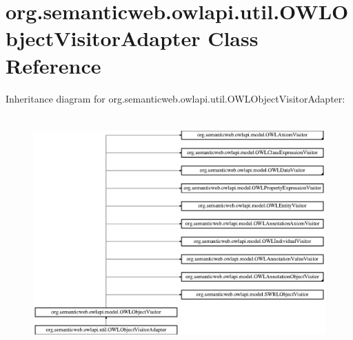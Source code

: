 \hypertarget{classorg_1_1semanticweb_1_1owlapi_1_1util_1_1_o_w_l_object_visitor_adapter}{\section{org.\-semanticweb.\-owlapi.\-util.\-O\-W\-L\-Object\-Visitor\-Adapter Class Reference}
\label{classorg_1_1semanticweb_1_1owlapi_1_1util_1_1_o_w_l_object_visitor_adapter}
}
Inheritance diagram for org.\-semanticweb.\-owlapi.\-util.\-O\-W\-L\-Object\-Visitor\-Adapter\-:\begin{figure}[H]
\begin{center}
\leavevmode
\includegraphics[height=9.056604cm]{classorg_1_1semanticweb_1_1owlapi_1_1util_1_1_o_w_l_object_visitor_adapter}
\end{center}
\end{figure}

